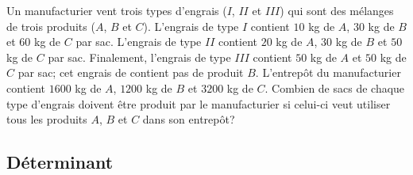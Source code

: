 \begin{question}
Un manufacturier vent trois types d'engrais ($I$, $II$ et $III$) qui
sont des mélanges de trois produits ($A$, $B$ et $C$).  L'engrais de
type $I$ contient $10$ kg de $A$, $30$ kg de $B$ et $60$ kg de $C$ par
sac.  L'engrais de type $II$ contient $20$ kg de $A$, $30$ kg de $B$
et $50$ kg de $C$ par sac.  Finalement,  l'engrais de type $III$
contient $50$ kg de $A$ et $50$ kg de $C$ par sac; cet engrais de
contient pas de produit $B$.  L'entrepôt du manufacturier contient
$1600$ kg de $A$, $1200$ kg de $B$ et $3200$ kg de $C$.  Combien de
sacs de chaque type d'engrais doivent être produit par le
manufacturier si celui-ci veut utiliser tous les produits $A$, $B$ 
et $C$ dans son entrepôt?
\label{12Q8}
\end{question}

\subsection{Déterminant}

